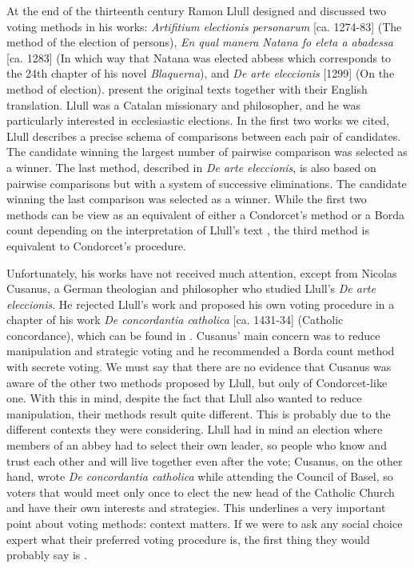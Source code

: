 At the end of the thirteenth century Ramon Llull designed and discussed two voting methods in his works: \textit{Artifitium electionis personarum} [ca. 1274-83] (The method of the election of persons), \textit{En qual manera Natana fo eleta a abadessa} [ca. 1283] (In which way that Natana was elected abbess which corresponds to the 24th chapter of his novel \textit{Blaquerna}), and \textit{De arte eleccionis} [1299] (On the method of election). \cite{Hagele2001} present the original texts together with their English translation. Llull was a Catalan missionary and philosopher, and he was particularly interested in ecclesiastic elections. In the first two works we cited, Llull describes a precise schema of comparisons between each pair of candidates. The candidate winning the largest number of pairwise comparison was selected as a winner. The last method, described in \textit{De arte eleccionis}, is also based on pairwise comparisons but with a system of successive eliminations. The candidate winning the last comparison was selected as a winner. While the first two methods can be view as an equivalent of either a Condorcet's method or a Borda count depending on the interpretation of Llull's text \citep{McLean1990}, the third method is equivalent to Condorcet's procedure.

Unfortunately, his works have not received much attention, except from Nicolas Cusanus, a German theologian and philosopher who studied Llull's \textit{De arte eleccionis}. He rejected Llull's work and proposed his own voting procedure in a chapter of his work \textit{De concordantia catholica} [ca. 1431-34] (Catholic concordance), which can be found in \citet[Chapter 4]{McLeanUrken1995}. Cusanus' main concern was to reduce manipulation and strategic voting and he recommended a Borda count method with secrete voting. We must say that there are no evidence that Cusanus was aware of the other two methods proposed by Llull, but only of Condorcet-like one. With this in mind, despite the fact that Llull also wanted to reduce manipulation, their methods result quite different. 
This is probably due to the different contexts they were considering. Llull had in mind an election where members of an abbey had to select their own leader, so people who know and trust each other and will live together even after the vote; Cusanus, on the other hand, wrote \textit{De concordantia catholica} while attending the Council of Basel, so voters that would meet only once to elect the new head of the Catholic Church and have their own interests and strategies. This underlines a very important point about voting methods: context matters. If we were to ask any social choice expert what their preferred voting procedure is, the first thing they would probably say is .

